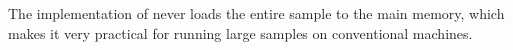 
%
%
%
%
%
%





\begin{remark}
The implementation of \algonameapx never loads the entire sample to the main memory, which makes it very practical for running large samples on conventional machines.
\end{remark}



